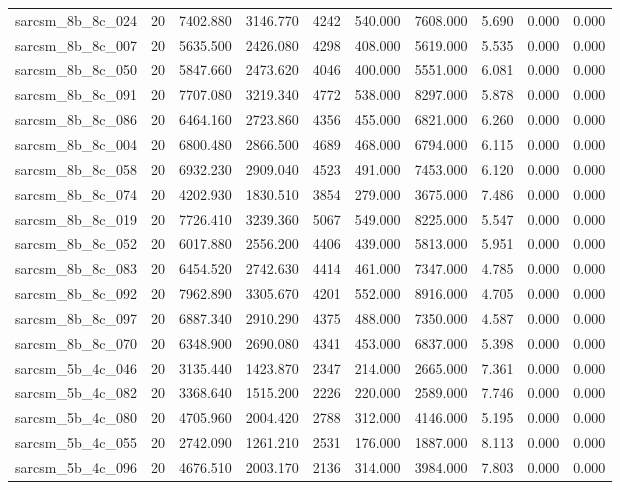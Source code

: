 \begin{tabular}{lrrrrrrrrr}
sarcsm\_8b\_8c\_024 & 20 & 7402.880 & 3146.770 & 4242 & 540.000 & 7608.000 & 5.690 & 0.000 & 0.000 \\
sarcsm\_8b\_8c\_007 & 20 & 5635.500 & 2426.080 & 4298 & 408.000 & 5619.000 & 5.535 & 0.000 & 0.000 \\
sarcsm\_8b\_8c\_050 & 20 & 5847.660 & 2473.620 & 4046 & 400.000 & 5551.000 & 6.081 & 0.000 & 0.000 \\
sarcsm\_8b\_8c\_091 & 20 & 7707.080 & 3219.340 & 4772 & 538.000 & 8297.000 & 5.878 & 0.000 & 0.000 \\
sarcsm\_8b\_8c\_086 & 20 & 6464.160 & 2723.860 & 4356 & 455.000 & 6821.000 & 6.260 & 0.000 & 0.000 \\
sarcsm\_8b\_8c\_004 & 20 & 6800.480 & 2866.500 & 4689 & 468.000 & 6794.000 & 6.115 & 0.000 & 0.000 \\
sarcsm\_8b\_8c\_058 & 20 & 6932.230 & 2909.040 & 4523 & 491.000 & 7453.000 & 6.120 & 0.000 & 0.000 \\
sarcsm\_8b\_8c\_074 & 20 & 4202.930 & 1830.510 & 3854 & 279.000 & 3675.000 & 7.486 & 0.000 & 0.000 \\
sarcsm\_8b\_8c\_019 & 20 & 7726.410 & 3239.360 & 5067 & 549.000 & 8225.000 & 5.547 & 0.000 & 0.000 \\
sarcsm\_8b\_8c\_052 & 20 & 6017.880 & 2556.200 & 4406 & 439.000 & 5813.000 & 5.951 & 0.000 & 0.000 \\
sarcsm\_8b\_8c\_083 & 20 & 6454.520 & 2742.630 & 4414 & 461.000 & 7347.000 & 4.785 & 0.000 & 0.000 \\
sarcsm\_8b\_8c\_092 & 20 & 7962.890 & 3305.670 & 4201 & 552.000 & 8916.000 & 4.705 & 0.000 & 0.000 \\
sarcsm\_8b\_8c\_097 & 20 & 6887.340 & 2910.290 & 4375 & 488.000 & 7350.000 & 4.587 & 0.000 & 0.000 \\
sarcsm\_8b\_8c\_070 & 20 & 6348.900 & 2690.080 & 4341 & 453.000 & 6837.000 & 5.398 & 0.000 & 0.000 \\
sarcsm\_5b\_4c\_046 & 20 & 3135.440 & 1423.870 & 2347 & 214.000 & 2665.000 & 7.361 & 0.000 & 0.000 \\
sarcsm\_5b\_4c\_082 & 20 & 3368.640 & 1515.200 & 2226 & 220.000 & 2589.000 & 7.746 & 0.000 & 0.000 \\
sarcsm\_5b\_4c\_080 & 20 & 4705.960 & 2004.420 & 2788 & 312.000 & 4146.000 & 5.195 & 0.000 & 0.000 \\
sarcsm\_5b\_4c\_055 & 20 & 2742.090 & 1261.210 & 2531 & 176.000 & 1887.000 & 8.113 & 0.000 & 0.000 \\
sarcsm\_5b\_4c\_096 & 20 & 4676.510 & 2003.170 & 2136 & 314.000 & 3984.000 & 7.803 & 0.000 & 0.000 \\

\end{tabular}
